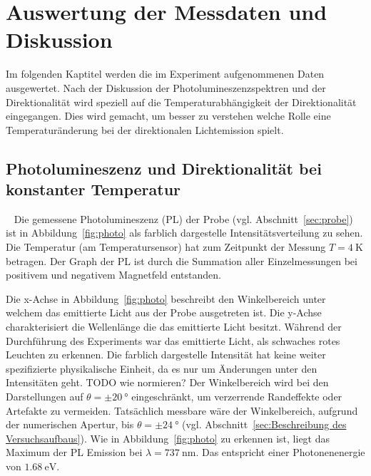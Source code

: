 \chapter{Auswertung der Messdaten und Diskussion}
Im folgenden Kaptitel werden die im Experiment aufgenommenen Daten ausgewertet. 
Nach der Diskussion der Photolumineszenzspektren und der 
Direktionalität wird speziell auf die Temperaturabhängigkeit der 
Direktionalität eingegangen.
Dies wird gemacht, um besser zu verstehen welche Rolle eine Temperaturänderung 
bei der direktionalen Lichtemission spielt.

\section{Photolumineszenz und Direktionalität bei konstanter Temperatur}~\label{sec:PL_u_Direktionalitaet}
Die gemessene Photolumineszenz (PL) der Probe (vgl. Abschnitt~\ref{sec:probe})
ist in Abbildung~\ref{fig:photo} als farblich dargestelle Intensitätsverteilung zu sehen. 
Die Temperatur (am Temperatursensor) hat zum Zeitpunkt der Messung $T = \SI{4}{\kelvin}$ betragen.
Der Graph der PL ist durch die Summation aller Einzelmessungen 
bei positivem und negativem Magnetfeld entstanden. 

Die x-Achse in Abbildung~\ref{fig:photo} beschreibt den Winkelbereich unter welchem das 
emittierte Licht aus der Probe ausgetreten ist.
Die y-Achse charakterisiert die Wellenlänge die das emittierte Licht besitzt. 
Während der Durchführung des Experiments war das emittierte Licht, als schwaches rotes Leuchten zu 
erkennen.
Die farblich dargestelle Intensität hat keine weiter spezifizierte physikalische Einheit, 
da es nur um Änderungen unter den Intensitäten geht. TODO wie normieren?
Der Winkelbereich wird bei den Darstellungen auf $\theta = \pm \SI{20}{\degree}$ 
eingeschränkt, um verzerrende Randeffekte oder Artefakte zu vermeiden. 
Tatsächlich messbare wäre der Winkelbereich, aufgrund der numerischen Apertur, 
bis $\theta = \pm \SI{24}{\degree}$ 
(vgl. Abschnitt~\ref{sec:Beschreibung des Versuchsaufbaus}).
Wie in Abbildung~\ref{fig:photo} zu erkennen ist, 
liegt das Maximum der PL Emission bei $\lambda = \SI{737}{\nano\meter}$.
Das entspricht einer Photonenenergie von $\SI{1,68}{\eV}$.

